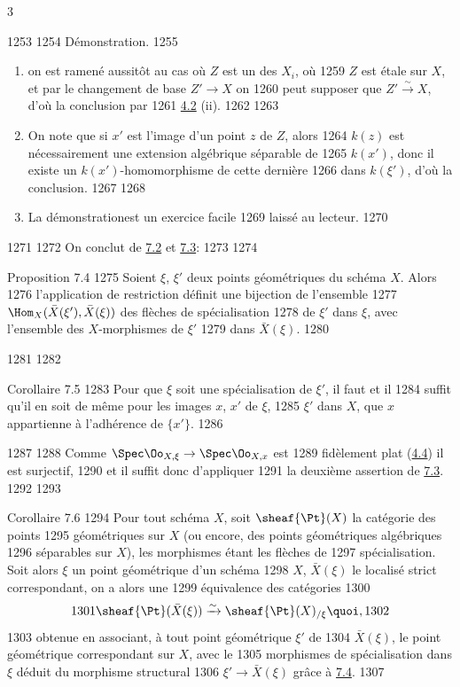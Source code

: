3	\documentclass[10pt]{../fichiers-configuration-latex/smfart}
\begin{document}
  1253	
  1254	Démonstration.
  1255	\begin{enumerate}
  1256	\renewcommand{\theenumi}{\alph{enumi}}
  1257	\renewcommand{\labelenumi}{\theenumi)}
  1258	\item on est ramené aussitôt au cas où $Z$ est un des $X_i$, \ie où
  1259	  $Z$ est étale sur $X$, et par le changement de base $Z'\to X$ on
  1260	  peut supposer que $Z'\xrightarrow{\sim} X$, d'où la conclusion par
  1261	  \hyperref[VIII.def4.2]{4.2} (ii).
  1262	
  1263	\item On note que si $x'$ est l'image d'un point $z$ de $Z$, alors
  1264	  $k(z)$ est nécessairement une extension algébrique séparable de
  1265	  $k(x')$, donc il existe un $k(x')$-homomorphisme de cette dernière
  1266	  dans $k(\xi')$, d'où la conclusion.
  1267	
  1268	\item La démonstration\pageoriginale est un exercice facile
  1269	  laissé au lecteur.
  1270	\end{enumerate}
  1271	
  1272	On conclut de \hyperref[VIII.def7.2]{7.2} et \hyperref[VIII.lem7.3]{7.3}:
  1273	
  1274	\begin{enonce*}{Proposition 7.4}
  1275	Soient $\xi$, $\xi'$ deux points géométriques du schéma $X$. Alors
  1276	l'application de restriction définit une bijection de l'ensemble
  1277	$\Hom_{X} (\bar{X}(\xi'), \bar{X}(\xi))$ des flèches de spécialisation
  1278	de $\xi'$ dans $\xi$, avec l'ensemble des $X$-morphismes de $\xi'$
  1279	dans $\bar{X}(\xi)$.
  1280	\end{enonce*}
  1281	
  1282	\begin{enonce*}{Corollaire 7.5}
  1283	Pour que $\xi$ soit une spécialisation de $\xi'$, il faut et il
  1284	suffit qu'il en soit de même pour les images $x$, $x'$ de $\xi$,
  1285	$\xi'$ dans $X$, \ie que $x$ appartienne à l'adhérence de $\{x'\}$.
  1286	\end{enonce*}
  1287	
  1288	Comme $\Spec \Oo_{X, \xi} \to \Spec \Oo_{X, x}$ est
  1289	fidèlement plat (\hyperref[VIII.subsec4.4]{4.4}) il est surjectif,
  1290	et il suffit donc d'appliquer
  1291	la deuxième assertion de \hyperref[VIII.lem7.3]{7.3}.
  1292	
  1293	\begin{enonce*}{Corollaire 7.6}
  1294	Pour tout schéma $X$, soit $\sheaf{\Pt}(X)$ la catégorie des points
  1295	géométriques sur $X$ (ou encore, des points géométriques algébriques
  1296	séparables sur $X$), les morphismes étant les flèches de
  1297	spécialisation. Soit alors $\xi$ un point géométrique d'un schéma
  1298	$X$, $\bar{X}(\xi)$ le localisé strict correspondant, on a alors une
  1299	équivalence des catégories
  1300	$$
  1301	\sheaf{\Pt}(\bar{X}(\xi)) \xrightarrow{\sim} \sheaf{\Pt}(X)_{/\xi}{\quoi},
  1302	$$
  1303	obtenue en associant, à tout point géométrique $\xi'$ de
  1304	$\bar{X}(\xi)$, le point géométrique correspondant sur $X$, avec le
  1305	morphismes de spécialisation dans $\xi$ déduit du morphisme structural
  1306	$\xi' \to \bar{X}(\xi)$ grâce à \hyperref[VIII.prop7.4]{7.4}.
  1307	\end{enonce*}
\end{document}
